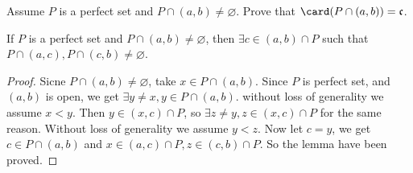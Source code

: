 \documentclass{ctexart}
\begin{document}
\begin{problem}\label{pro:3}
  Assume \(P\) is a perfect set and \(P \cap (a,b) \neq \varnothing\). Prove that \(\card(P \cap (a,b))=\mathfrak{c}\). 
\end{problem}
\begin{lemma}\label{lem:1}
  If \(P\) is a perfect set and \(P \cap (a,b) \neq \varnothing\), then \(\exists c \in (a,b) \cap P\) such that \(P \cap (a,c),P \cap(c,b)\neq \varnothing\). 
\end{lemma}
\begin{proof}
  Sicne \(P \cap(a,b) \neq \varnothing\), take \(x \in P \cap (a,b)\). 
  Since \(P\) is perfect set, and \((a,b)\) is open, we get \(\exists y \neq x,y \in P \cap (a,b)\). 
  without loss of generality we assume \(x<y\). Then \(y \in (x,c) \cap P\), so \(\exists z \neq y,z \in (x,c) \cap P\) for the same reason. 
  Without loss of generality we assume \(y<z\). Now let \(c=y\), we get \(c \in P \cap (a,b)\) and \(x \in (a,c) \cap P,z \in (c,b) \cap P\). 
  So the lemma have been proved. 
\end{proof}
\end{document}
